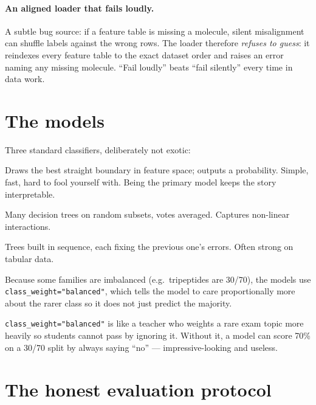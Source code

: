 \documentclass[11pt]{article}
\newenvironment{callout}[2][blue]{%
  \par\smallskip\colorlet{shadecolor}{#1!7}%
  \begin{shaded}\noindent{\color{#1!55!black}\bfseries #2.\ }\ignorespaces}%
  {\end{shaded}\smallskip}
\newcommand{\code}[1]{\texttt{#1}}
\begin{document}
\paragraph{An aligned loader that fails loudly.} A subtle bug source: if a feature
table is missing a molecule, silent misalignment can shuffle labels against the
wrong rows. The loader therefore \emph{refuses to guess}: it reindexes every
feature table to the exact dataset order and raises an error naming any missing
molecule. ``Fail loudly'' beats ``fail silently'' every time in data work.

\section{The models}\label{sec:models}

Three standard classifiers, deliberately not exotic:
\begin{description}[leftmargin=1.6em,style=nextline]
  \item[Logistic regression (primary).] Draws the best straight boundary in
    feature space; outputs a probability. Simple, fast, hard to fool yourself
    with. Being the primary model keeps the story interpretable.
  \item[Random forest.] Many decision trees on random subsets, votes averaged.
    Captures non-linear interactions.
  \item[HistGradientBoosting.] Trees built in sequence, each fixing the previous
    one's errors. Often strong on tabular data.
\end{description}

Because some families are imbalanced (e.g.\ tripeptides are 30/70), the models use
\code{class\_weight="balanced"}, which tells the model to care proportionally more
about the rarer class so it does not just predict the majority.

\begin{callout}[violet]{Analogy}
\code{class\_weight="balanced"} is like a teacher who weights a rare exam topic
more heavily so students cannot pass by ignoring it. Without it, a model can score
70\% on a 30/70 split by always saying ``no'' --- impressive-looking and useless.
\end{callout}

\section{The honest evaluation protocol}\label{sec:protocol}
\end{document}
